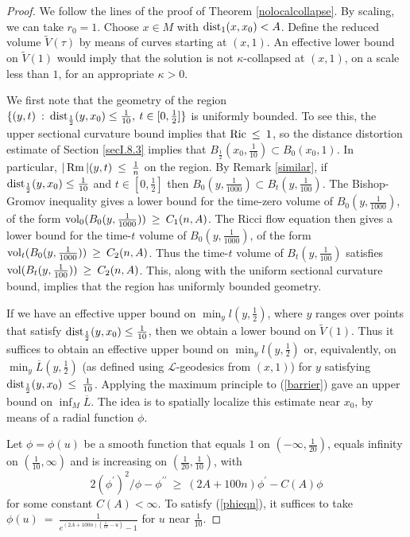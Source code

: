 \begin{proof}
We follow the lines of the proof of Theorem \ref{nolocalcollapse}.
By scaling, we can take $r_0 = 1$. Choose $x \in M$ with
$\operatorname{dist}_{1}(x,x_0) < A$. Define the reduced volume
$\tilde{V}(\tau)$ by
means of curves starting at $(x, 1)$. An effective lower bound
on $\tilde{V}(1)$ would imply that the solution is not $\kappa$-collapsed
at $(x, 1)$, on a scale less than $1$, for an appropriate $\kappa > 0$.

We first note that the geometry of the region $\{(y, t) \: : \:
\operatorname{dist}_{\frac12}(y,x_0)
\le \frac{1}{10}, \: t \in [0, \frac12 ]\}$ is uniformly bounded.
To see this, the upper sectional curvature bound implies that
$\operatorname{Ric} \: \le \: 1$, so the
distance distortion estimate of
Section \ref{secI.8.3} implies that
$B_{\frac12}(x_0, \frac{1}{10}) \subset B_0(x_0, 1)$.
In particular, $|\operatorname{Rm}|(y,t) \: \le \: \frac{1}{n}$
on the region. By Remark \ref{similar},
if $\operatorname{dist}_{\frac12}(y,x_0)
\le \frac{1}{10}$ and $t \in [0, \frac12 ]$ then
$B_0(y, \frac{1}{1000}) \subset B_t(y, \frac{1}{100})$.
The Bishop-Gromov inequality gives a lower bound for the
time-zero volume of $B_0(y, \frac{1}{1000})$, of the form
$\operatorname{vol}_0(B_0(y, \frac{1}{1000})) \: \ge \: C_1(n,A)$.
The Ricci flow equation then gives a lower bound for
the time-$t$ volume of $B_0(y, \frac{1}{1000})$, of the form
$\operatorname{vol}_t(B_0(y, \frac{1}{1000})) \: \ge \: C_2(n,A)$.
Thus the time-$t$ volume of $B_t(y, \frac{1}{100})$ satisfies
$\operatorname{vol}(B_t(y, \frac{1}{100})) \: \ge \: C_2(n,A)$.
This, along with the uniform sectional curvature bound,
implies that the region has uniformly bounded geometry.

If we have an effective upper bound on $\min_y l(y, \frac12)$,
where $y$ ranges over points that satisfy $\operatorname{dist}_{\frac12}(y,x_0)
\le \frac{1}{10}$, then we obtain a lower bound on
$\tilde{V} \left( 1 \right)$.
Thus it suffices to obtain an effective upper bound on $\min_y
l(y, \frac{1}{2})$ or,
equivalently, on $\min_y \overline{L}(y, \frac{1}{2})$
(as defined using ${\mathcal L}$-geodesics
from $(x,1)$) for $y$ satisfying $\operatorname{dist}_{\frac{1}{2}}(y, x_0) \: \le \:
\frac{1}{10}$.
Applying the maximum principle to (\ref{barrier}) gave an upper bound
on $\inf_M \overline{L}$. The idea is to spatially
localize this estimate near $x_0$,
by means of a radial function $\phi$.

Let $\phi = \phi(u)$ be a smooth function that equals $1$ on
$(- \infty, \frac{1}{20})$, equals infinity on
$(\frac{1}{10}, \infty)$ and is increasing on
$(\frac{1}{20}, \frac{1}{10})$, with
\begin{equation} \label{phieqn}
2 (\phi^\prime)^2/\phi - \phi^{\prime \prime} \: \ge \:
(2A+100n) \phi^\prime - C(A) \phi
\end{equation}
for some constant $C(A) < \infty$.
To satisfy (\ref{phieqn}),
it suffices to take $\phi(u) \: = \: \frac{1}{e^{(2A+100n)
(\frac{1}{10} - u)} - 1}$ for $u$ near $\frac{1}{10}$.


\end{proof}
